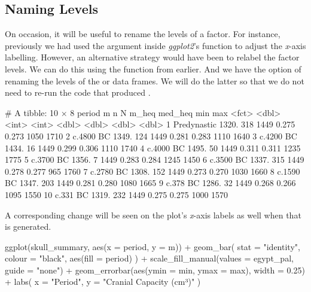\subsection{Naming Levels}

On occasion, it will be useful to rename the levels of a factor. For instance, previously we had used the  argument inside \textit{ggplot2}'s  function to adjust the \textit{x}-axis labelling. However, an alternative strategy would have been to relabel the factor levels. We can do this using the  function from earlier. And we have the option of renaming the levels of the  or  data frames. We will do the latter so that we do not need to re-run the code that produced .

\begin{outR}
# A tibble: 10 × 8
   period          m     n     N m_heq med_heq   min   max
   <fct>       <dbl> <int> <int> <dbl>   <dbl> <dbl> <dbl>
 1 Predynastic 1320.   318  1449 0.275   0.273  1050  1710
 2 c.4800 BC   1349.   124  1449 0.281   0.283  1110  1640
 3 c.4200 BC   1434.    16  1449 0.299   0.306  1110  1740
 4 c.4000 BC   1495.    50  1449 0.311   0.311  1235  1775
 5 c.3700 BC   1356.     7  1449 0.283   0.284  1245  1450
 6 c.3500 BC   1337.   315  1449 0.278   0.277   965  1760
 7 c.2780 BC   1308.   152  1449 0.273   0.270  1030  1660
 8 c.1590 BC   1347.   203  1449 0.281   0.280  1080  1665
 9 c.378 BC    1286.    32  1449 0.268   0.266  1095  1550
10 c.331 BC    1319.   232  1449 0.275   0.275  1000  1570
\end{outR}

\noindent
A corresponding change will be seen on the plot's \textit{x}-axis labels as well when that is generated.

\begin{inR}
ggplot(skull_summary, aes(x = period, y = m)) +
  geom_bar(
    stat = "identity",
    colour = "black",
    aes(fill = period)
  ) +
  scale_fill_manual(values = egypt_pal, guide = "none") +
  geom_errorbar(aes(ymin = min, ymax = max), width = 0.25) +
  labs(
    x = "Period",
    y = "Cranial Capacity (cm³)"
  )
\end{inR}

